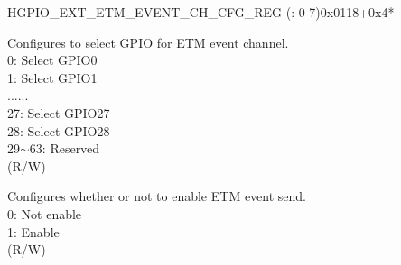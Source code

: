 \begin{register}{H}{GPIO\_EXT\_ETM\_EVENT\_CH\_CFG\_REG (: 0-7)}{0x0118+0x4*}\label{regdesc:GPIOEXTETMEVENTCHNCFGREG}
%
%
%
%
\regnewline%
\begin{regdesc}\begin{reglist}
\label{fielddesc:GPIOEXTETMCH0EVENTSEL}\item [GPIO\_EXT\_ETM\_CH\regindex{n}\_EVENT\_SEL] Configures to select GPIO for ETM event channel.\\
0: Select GPIO0\\
1: Select GPIO1\\
......\\
27: Select GPIO27\\
28: Select GPIO28\\ 
29$\sim$63: Reserved\\ (R/W)
\label{fielddesc:GPIOEXTETMCH0EVENTEN}\item [GPIO\_EXT\_ETM\_CH\regindex{n}\_EVENT\_EN] Configures whether or not to enable ETM event send.\\
0: Not enable\\
1: Enable\\ (R/W)
\end{reglist}\end{regdesc}
\end{register}


